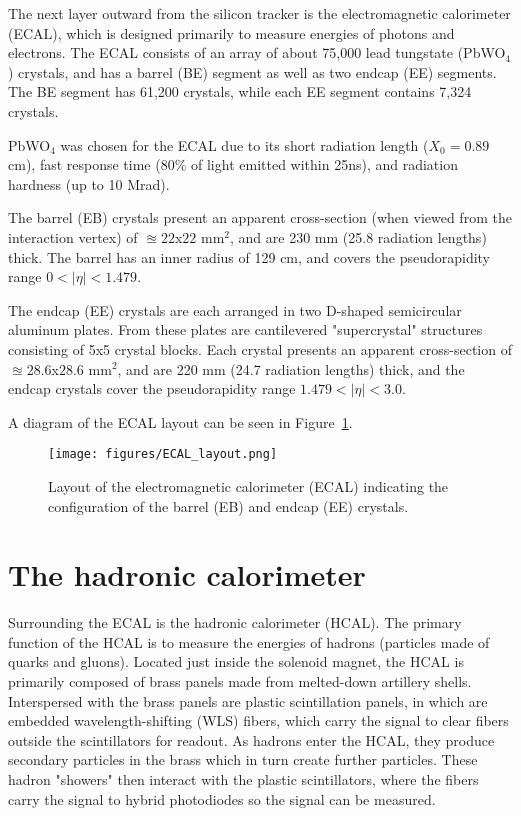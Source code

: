 The next layer outward from the silicon tracker is the electromagnetic calorimeter (ECAL), which is designed primarily to measure energies of photons and electrons. The ECAL consists of an array of about 75,000 lead tungstate (PbWO$_4$) crystals, and has a barrel (BE) segment as well as two endcap (EE) segments. The BE segment has 61,200 crystals, while each EE segment contains 7,324 crystals.

PbWO$_4$ was chosen for the ECAL due to its short radiation length ($X_0 = 0.89$ cm), fast response time ($80\%$ of light emitted within 25ns), and radiation hardness (up to 10 Mrad).

The barrel (EB) crystals present an apparent cross-section (when viewed from the interaction vertex) of $\approxeq 22$x$22$ mm$^2$, and are 230 mm (25.8 radiation lengths) thick. The barrel has an inner radius of 129 cm, and covers the pseudorapidity range $0 \lt |\eta| \lt 1.479$.

The endcap (EE) crystals are each arranged in two D-shaped semicircular aluminum plates. From these plates are cantilevered "supercrystal" structures consisting of 5x5 crystal blocks. Each crystal presents an apparent cross-section of $\approxeq 28.6$x$28.6$ mm$^2$, and are 220 mm (24.7 radiation lengths) thick, and the endcap crystals cover the pseudorapidity range $1.479 \lt |\eta| \lt 3.0$.

A diagram of the ECAL layout can be seen in Figure~\ref{fig:ECAL_layout}.

\begin{figure}\centering
  \texttt{[image: figures/ECAL\_layout.png]}
  \caption{\label{fig:ECAL_layout} Layout of the electromagnetic calorimeter (ECAL) indicating the configuration of the barrel (EB) and endcap (EE) crystals.}
\end{figure}


\section{The hadronic calorimeter}

Surrounding the ECAL is the hadronic calorimeter (HCAL). The primary function of the HCAL is to measure the energies of hadrons (particles made of quarks and gluons). Located just inside the solenoid magnet, the HCAL is primarily composed of brass panels made from melted-down artillery shells. Interspersed with the brass panels are plastic scintillation panels, in which are embedded wavelength-shifting (WLS) fibers, which carry the signal to clear fibers outside the scintillators for readout. As hadrons enter the HCAL, they produce secondary particles in the brass which in turn create further particles. These hadron "showers" then interact with the plastic scintillators, where the fibers carry the signal to hybrid photodiodes so the signal can be measured.

